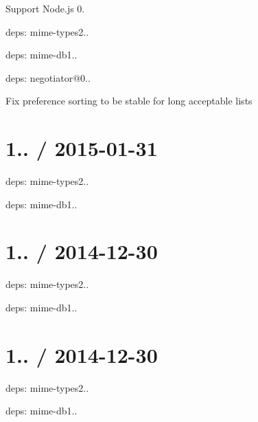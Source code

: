 \begin{DoxyItemize}
\item Support Node.\+js 0.
\item deps\+: mime-\/types2..
\begin{DoxyItemize}
\item deps\+: mime-\/db1..
\end{DoxyItemize}
\item deps\+: negotiator@0..
\begin{DoxyItemize}
\item Fix preference sorting to be stable for long acceptable lists
\end{DoxyItemize}
\end{DoxyItemize}

\section*{1.. / 2015-\/01-\/31 }


\begin{DoxyItemize}
\item deps\+: mime-\/types2..
\begin{DoxyItemize}
\item deps\+: mime-\/db1..
\end{DoxyItemize}
\end{DoxyItemize}

\section*{1.. / 2014-\/12-\/30 }


\begin{DoxyItemize}
\item deps\+: mime-\/types2..
\begin{DoxyItemize}
\item deps\+: mime-\/db1..
\end{DoxyItemize}
\end{DoxyItemize}

\section*{1.. / 2014-\/12-\/30 }


\begin{DoxyItemize}
\item deps\+: mime-\/types2..
\begin{DoxyItemize}
\item deps\+: mime-\/db1..
\end{DoxyItemize}
\end{DoxyItemize}

